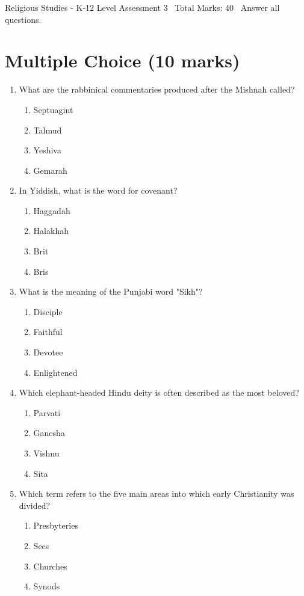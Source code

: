 \documentclass[12pt]{article}
\begin{document}
\begin{center}
Religious Studies - K-12 Level Assessment 3 \
Total Marks: 40 \
Answer all questions.
\end{center}

\section*{Multiple Choice (10 marks)}
\begin{enumerate}[label=\arabic*.]
\item What are the rabbinical commentaries produced after the Mishnah called?
\begin{enumerate}[label=(\alph*)]
    \item Septuagint
    \item Talmud
    \item Yeshiva
    \item Gemarah
\end{enumerate}
\item In Yiddish, what is the word for covenant?
\begin{enumerate}[label=(\alph*)]
    \item Haggadah
    \item Halakhah
    \item Brit
    \item Bris
\end{enumerate}
\item What is the meaning of the Punjabi word "Sikh"?
\begin{enumerate}[label=(\alph*)]
    \item Disciple
    \item Faithful
    \item Devotee
    \item Enlightened
\end{enumerate}
\item Which elephant-headed Hindu deity is often described as the most beloved?
\begin{enumerate}[label=(\alph*)]
    \item Parvati
    \item Ganesha
    \item Vishnu
    \item Sita
\end{enumerate}
\item Which term refers to the five main areas into which early Christianity was divided?
\begin{enumerate}[label=(\alph*)]
    \item Presbyteries
    \item Sees
    \item Churches
    \item Synods
\end{enumerate}
\end{enumerate}
\end{document}
